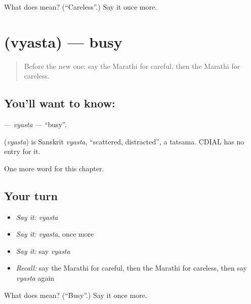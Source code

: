 \begin{tcolorbox}[breakable,colback=teal!4,colframe=teal!35!black,title={Before you move on}]
What does  mean? (\textquotedblleft{}Careless\textquotedblright{}.) Say it once more.
\end{tcolorbox}
\section[\texorpdfstring{\mr{व्यस्त} (vyasta)}{व्यस्त (vyasta)}]{ (vyasta) — busy}

\label{lesson:MR-C207-vyasta}



\begin{quote}
Before the new one: say the Marathi for careful, then the Marathi for careless.
\end{quote}

\subsection*{You'll want to know: }
\textbf{} — \emph{vyasta} — \textquotedblleft{}busy\textquotedblright{}.

\begin{cousinweb}
\textbf{} (\emph{vyasta}) is Sanskrit \emph{vyasta}, \textquotedblleft{}scattered, distracted\textquotedblright{}, a tatsama. CDIAL has no entry for it.
\end{cousinweb}

\begin{grammarlens}[title={What you've built}]
One more word for this chapter.
\end{grammarlens}

\subsection*{Your turn}
\begin{itemize}
\raggedright
  \item \emph{Say it:} \emph{vyasta}
  \item \emph{Say it:} \emph{vyasta}, once more
  \item \emph{Say it:} say \emph{vyasta}
  \item \emph{Recall:} say the Marathi for careful, then the Marathi for careless, then say \emph{vyasta} again
\end{itemize}

\begin{tcolorbox}[breakable,colback=teal!4,colframe=teal!35!black,title={Before you move on}]
What does  mean? (\textquotedblleft{}Busy\textquotedblright{}.) Say it once more.
\end{tcolorbox}
